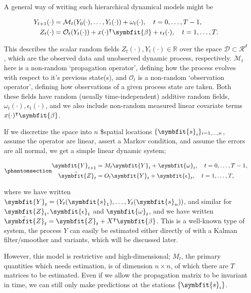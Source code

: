 \documentclass[
]{report}
\newcommand{\bv}[1]{\symbfit{#1}}
\theoremstyle{plain}
\theoremstyle{plain}
\theoremstyle{plain}
\theoremstyle{remark}
\begin{document}
A general way of writing such hierarchical dynamical models might be

\[\begin{split}
Y_{t+1}(\cdot) &= \mathcal M_t(Y_0(\cdot), \dots, Y_t(\cdot)) + \omega_t(\cdot), \quad t=0, \dots, T-1,\\
Z_t(\cdot) &= \mathcal O_t(Y_t(\cdot)) + x(\cdot)^{\intercal}\bv \beta + \epsilon_t(\cdot), \quad t=1,\dots,T.
\end{split}
\]

This describes the scalar random fields
\(Z_t(\cdot), Y_t(\cdot)\in \mathbb R\) over the space
\(\mathcal D\subset \mathcal R^d\), which are the observed data and
unobserved dynamic process, respectively. \(\mathcal M_t\) here is a
non-random `propagation operator', defining how the process evolves with
respect to it's previous state(s), and \(\mathcal O_t\) is a non-random
`observation operator', defining how observations of a given process
state are taken. Both these fields have random (usually
time-independent) additive random fields,
\(\omega_t(\cdot), \epsilon_t(\cdot)\), and we also include non-random
measured linear covariate terms \(x(\cdot)^{\intercal}\bv \beta\).

If we discretize the space into \(n\) \$spatial locations
\(\{\bv s_i\}_{i=1,\dots, n}\), assume the operator are linear, assert a
Markov condition, and assume the errors are all normal, we get a simple
linear dynamic system;

\begin{equation}\phantomsection\label{eq-ldstm}{\begin{split}
\bv Y_{t+1} &= M_t\bv Y_t + \bv \omega_t, \quad t=0, \dots, T-1,\\
\tilde{\bv Z}_t &= O_t\bv Y_t + \bv \epsilon_t, \quad t=1,\dots,T,
\end{split}
}\end{equation}

where we have written \(\bv Y_t = (Y_t(\bv s_1),\dots, Y_t(\bv s_n))\),
and similar for \(\bv Z_t, \bv \epsilon_t\) and \(\bv\omega_t\), and we
have written \(\tilde{\bv Z}_t = \bv Z_t + X^{\intercal}\bv \beta\).
This is a well-known type of system, the process \(Y\) can easily be
estimated either directly of with a Kalman filter/smoother and variants,
which will be discussed later.

However, this model is restrictive and high-dimensional; \(M_t\), the
primary quantities which needs estimation, is of dimension
\(n\times n\), of which there are \(T\) matrices to be estimated. Even
if we allow the propagation matrix to be invariant in time, we can still
only make predictions at the stations \(\{\bv s_i\}\).
\end{document}
